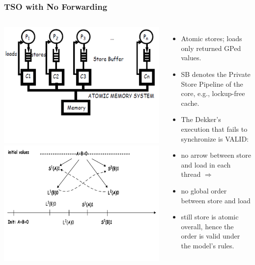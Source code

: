 \documentclass{beamer}
\begin{document}
\begin{frame}[fragile,t]
\frametitle{TSO with No Forwarding}


\begin{columns}
\includegraphics[width=39ex]{Ch7Figs/NoFwdingStoreBuf}\\\vspace{-5ex}
\includegraphics[width=39ex]{Ch7Figs/NoFwdingStoreBufGraph}\pause
{}
\vspace{-9ex}
\begin{itemize}
    \item Atomic stores; loads only returned GPed values.
    \item \alert{SB denotes the Private Store Pipeline} of the core, e.g., lockup-free cache.
    \item The Dekker's execution that fails to synchronize is VALID:
    \item no arrow between store and load in each thread $\Rightarrow$
    \item no global order between store and load
    \item still store is atomic overall, hence the order is valid under the model's rules.
\end{itemize}
\end{columns}
\end{frame}
\end{document}
